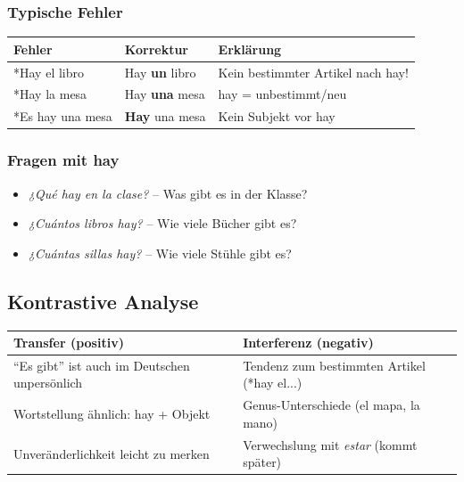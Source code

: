 \documentclass[11pt,a4paper]{article}
\begin{document}
\subsubsection{Typische Fehler}

\begin{center}
\begin{tabular}{|l|l|l|}
\hline
\textbf{Fehler} & \textbf{Korrektur} & \textbf{Erklärung} \\
\hline
*Hay el libro & Hay \textbf{un} libro & Kein bestimmter Artikel nach hay! \\
*Hay la mesa & Hay \textbf{una} mesa & hay = unbestimmt/neu \\
*Es hay una mesa & \textbf{Hay} una mesa & Kein Subjekt vor hay \\
\hline
\end{tabular}
\end{center}

\subsubsection{Fragen mit hay}

\begin{itemize}
    \item \textit{¿Qué hay en la clase?} -- Was gibt es in der Klasse?
    \item \textit{¿Cuántos libros hay?} -- Wie viele Bücher gibt es?
    \item \textit{¿Cuántas sillas hay?} -- Wie viele Stühle gibt es?
\end{itemize}

\subsection{Kontrastive Analyse}

\begin{tabular}{|p{6cm}|p{7cm}|}
\hline
\textbf{Transfer (positiv)} & \textbf{Interferenz (negativ)} \\
\hline
``Es gibt'' ist auch im Deutschen unpersönlich & Tendenz zum bestimmten Artikel (*hay el...) \\
\hline
Wortstellung ähnlich: hay + Objekt & Genus-Unterschiede (el mapa, la mano) \\
\hline
Unveränderlichkeit leicht zu merken & Verwechslung mit \textit{estar} (kommt später) \\
\hline
\end{tabular}

\end{document}
